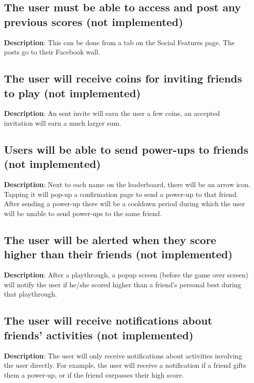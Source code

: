 \subsection{The user must be able to access and post any previous scores (not implemented)}
\textbf{Description}: This can be done from a tab on the Social Features
page. The posts go to their Facebook wall.

\subsection{The user will receive coins for inviting friends to play (not implemented)}
\textbf{Description}: An sent invite will earn the user a few coins,
an accepted invitation will earn a much larger sum. 

\subsection{Users will be able to send power-ups to friends (not implemented)}
\textbf{Description}: Next to each name on the leaderboard, there
will be an arrow icon. Tapping it will pop-up a confirmation page
to send a power-up to that friend. After sending a power-up there
will be a cooldown period during which the user will be unable to
send power-ups to the same friend.

\subsection{The user will be alerted when they score higher than their
friends (not implemented)}
\textbf{Description}: After a playthrough, a popup screen (before
the game over screen) will notify the user if he/she scored higher
than a friend\textquoteright{}s personal best during that playthrough.

\subsection{The user will receive notifications about friends\textquoteright{}
activities (not implemented)}
\textbf{Description}: The user will only receive notifications about
activities involving the user directly. For example, the user will
receive a notification if a friend gifts them a power-up, or if the
friend surpasses their high score.

